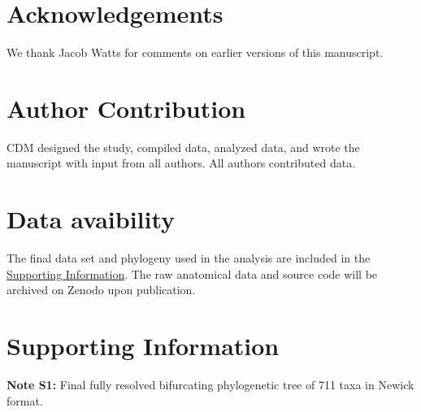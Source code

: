 \documentclass[
  10pt,
]{article}
\begin{document}
\hypertarget{acknowledgements}{%
\section{Acknowledgements}\label{acknowledgements}}

We thank Jacob Watts for comments on earlier versions of this manuscript.

\hypertarget{author-contribution}{%
\section{Author Contribution}\label{author-contribution}}

CDM designed the study, compiled data, analyzed data, and wrote the manuscript with input from all authors. All authors contributed data.

\hypertarget{data-avaibility}{%
\section{Data avaibility}\label{data-avaibility}}

The final data set and phylogeny used in the analysis are included in the \protect\hyperlink{supporting-information}{Supporting Information}. The raw anatomical data and source code will be archived on Zenodo upon publication.

\clearpage

\hypertarget{supporting-information}{%
\section{Supporting Information}\label{supporting-information}}

\renewcommand\thefigure{S\arabic{figure}}    
\renewcommand\thetable{S\arabic{table}}    
\setcounter{figure}{0}    
\setcounter{table}{0}

\textbf{Note S1:} Final fully resolved bifurcating phylogenetic tree of 711 taxa in Newick format.
\end{document}

